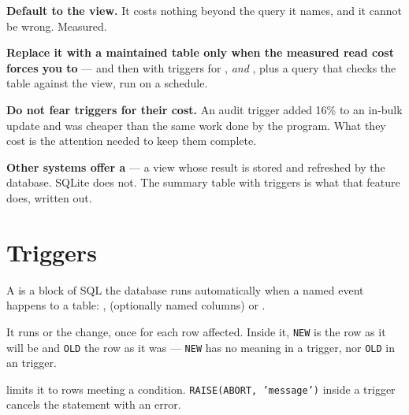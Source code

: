 \begin{alertbox}
\begin{tight}
  \item \textbf{Default to the view.} It costs nothing beyond the query it
        names, and it cannot be wrong. Measured.
  \item \textbf{Replace it with a maintained table only when the measured read
        cost forces you to} --- and then with triggers for ,
         \emph{and} , plus a query that checks the
        table against the view, run on a schedule.
  \item \textbf{Do not fear triggers for their cost.} An audit trigger added
        16\% to an in-bulk update and was cheaper than the same work done by
        the program. What they cost is the attention needed to keep them
        complete.
  \item \textbf{Other systems offer a } --- a view
        whose result is stored and refreshed by the database. SQLite does not.
        The summary table with triggers is what that feature does, written out.
\end{tight}
\end{alertbox}

\section{Triggers}

\begin{definitionbox}[Trigger]
A  is a block of SQL the database runs automatically when a
named event happens to a table: ,  (optionally
 named columns) or .

\smallskip
It runs  or  the change, once for each row
affected. Inside it, \texttt{NEW} is the row as it will be and \texttt{OLD} the
row as it was --- \texttt{NEW} has no meaning in a  trigger, nor
\texttt{OLD} in an  trigger.

\smallskip
{} limits it to rows meeting a condition. \texttt{RAISE(ABORT,
'message')} inside a trigger cancels the statement with an error.
\end{definitionbox}

